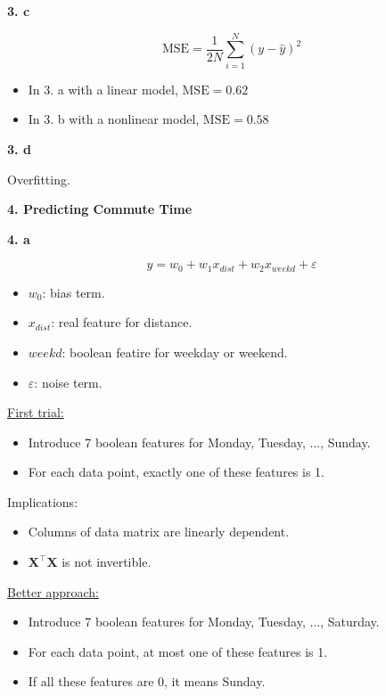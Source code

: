 \documentclass{article}
\begin{document}
\textbf{3. c}

\[
\textrm{MSE}=\frac{1}{2N}\sum_{i=1}^{N}(y-\hat{y})^2
\]

\begin{itemize}
    \item In 3. a with a linear model, $\textrm{MSE}=0.62$
    \item In 3. b with a nonlinear model, $\textrm{MSE}=0.58$
\end{itemize}

\textbf{3. d}

Overfitting.

\vspace{5mm}

\textbf{4. Predicting Commute Time}

\textbf{4. a}

\[
y=w_0+w_1x_{dist}+w_2x_{weekd}+\varepsilon
\]

\begin{itemize}
    \item $w_0$: bias term.
    \item $x_{dist}$: real feature for distance.
    \item $weekd$: boolean featire for weekday or weekend.
    \item $\varepsilon$: noise term.
\end{itemize}

\underline{First trial:}

\begin{itemize}
    \item Introduce 7 boolean features for Monday, Tuesday, ..., Sunday.
    \item For each data point, exactly one of these features is 1.
\end{itemize}

Implications:

\begin{itemize}
    \item Columns of data matrix are linearly dependent.
    \item $\mathbf{X}^{\intercal}\mathbf{X}$ is not invertible.
\end{itemize}

\underline{Better approach:}

\begin{itemize}
    \item Introduce 7 boolean features for Monday, Tuesday, ..., Saturday.
    \item For each data point, at most one of these features is 1.
    \item If all these features are 0, it means Sunday.
\end{itemize}
\end{document}
